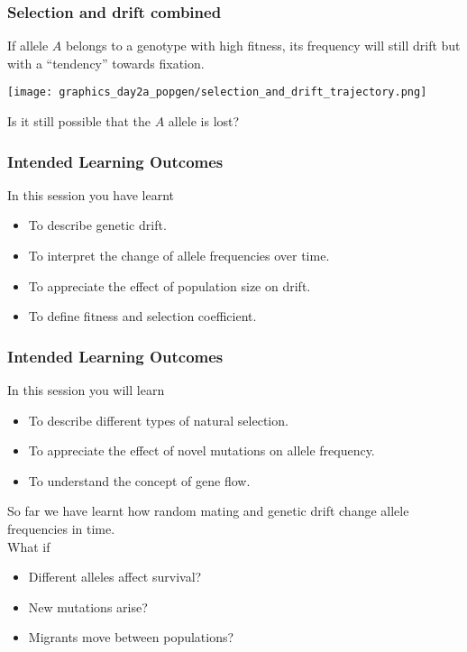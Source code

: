 \documentclass{beamer}
\newcommand{\1}{\ensuremath{\mathbf{1}}}
\begin{document}
%
%
%
\begin{frame}\frametitle{Selection and drift combined}
	If allele $A$ belongs to a genotype with high fitness, its frequency will still drift but with a ``tendency'' towards fixation.
	\begin{center}
		\texttt{[image: graphics\_day2a\_popgen/selection\_and\_drift\_trajectory.png]}
	\end{center}
	Is it still possible that the $A$ allele is lost?
\end{frame}
%
%
%
\begin{frame}\frametitle{Intended Learning Outcomes}
	In this session you have learnt
	\begin{itemize}
		\item To describe genetic drift.
		\item To interpret the change of allele frequencies over time.
		\item To appreciate the effect of population size on drift.
		\item To define fitness and selection coefficient.
	\end{itemize}
\end{frame}
%
%
%
\begin{frame}\frametitle{Intended Learning Outcomes}
	In this session you will learn
	\begin{itemize}
		\item To describe different types of natural selection.
		\item To appreciate the effect of novel mutations on allele frequency.
		\item To understand the concept of gene flow.
	\end{itemize}
\end{frame}
%
%
%
\begin{frame}
	So far we have learnt how random mating and genetic drift change allele frequencies in time.\\
	What if
	\begin{itemize}
		\item Different alleles affect survival?
		\item New mutations arise?
		\item Migrants move between populations?
	\end{itemize}
\end{frame}
\end{document}
